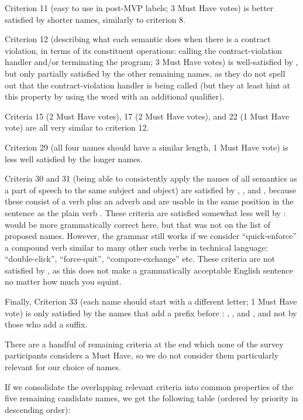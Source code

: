 Criterion 11 (easy to use in post-MVP labels; 3 Must Have votes) is better satisfied by shorter names, similarly to criterion 8. 

Criterion 12 (describing what each semantic does when there is a contract violation, in terms of its constituent operations: calling the contract-violation handler and/or terminating the program; 3 Must Have votes) is well-satisfied by , but only partially satisfied by the other remaining names, as they do not spell out that the contract-violation handler is being called (but they at least hint at this property by using the word  with an additional qualifier).

Criteria 15 (2 Must Have votes), 17 (2 Must Have votes), and 22 (1 Must Have vote) are all very similar to criterion 12.

Criterion 29 (all four names should have a similar length, 1 Must Have vote) is less well satisfied by the longer names.

Criteria 30 and 31 (being able to consistently apply the names of all semantics as a part of speech to the same subject and object) are satisfied by , , and \mbox{}, because these consist of a verb plus an adverb and are usable in the same position in the sentence as the plain verb . These criteria are satisfied somewhat less well by \mbox{}:  would be more grammatically correct here, but that was not on the list of proposed names. However, the grammar still works if we consider ``quick-enforce'' a compound verb similar to many other such verbs in technical language: ``double-click'', ``force-quit'', ``compare-exchange'' etc. These criteria are not satisfied by , as this does not make a grammatically acceptable English sentence no matter how much you squint.

Finally, Criterion 33 (each name should start with a different letter; 1 Must Have vote) is only satisfied by the names that add a prefix before : , , and , and not by those who add a suffix.

There are a handful of remaining criteria at the end which none of the survey participants considers a Must Have, so we do not consider them particularly relevant for our choice of names.

If we consolidate the overlapping relevant criteria into common properties of the five remaining candidate names, we get the following table (ordered by priority in descending order):

